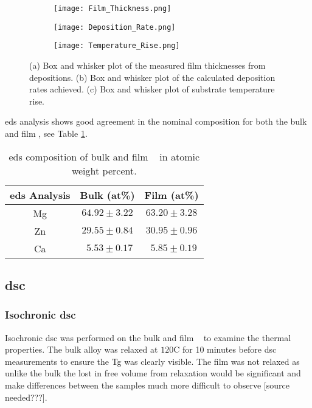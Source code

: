 \documentclass[a4paper,12pt,oneside]{article}%
\begin{document}
\begin{figure}[h]
	\centering
	\begin{subfigure}[htbp]{0.32\textwidth}
		\texttt{[image: Film\_Thickness.png]}
		\caption{}
		\label{fig:Film_Thickness}
	\end{subfigure}
	\begin{subfigure}[htbp]{0.32\textwidth}
		\texttt{[image: Deposition\_Rate.png]}
		\caption{}
		\label{fig:Deposition_Rate}
	\end{subfigure}
\begin{subfigure}[htbp]{0.32\textwidth}
	\texttt{[image: Temperature\_Rise.png]}
	\caption{}
	\label{fig:Temperature_Rise}
\end{subfigure}
	\caption{(a) Box and whisker plot of the measured film thicknesses from depositions. (b) Box and whisker plot of the calculated deposition rates achieved. (c) Box and whisker plot of substrate temperature rise.}%
	\label{fig:Film_Thickness_DepRate}
\end{figure}

\acrshort{eds} analysis shows good agreement in the nominal composition for both the bulk and film \MgZnCa, see Table \ref{tab:EDS_Composition}.

\begin{table}[h]
	\centering
	\caption{\acrshort{eds} composition of bulk and film \MgZnCa~ in atomic weight percent.}
	\begin{tabular}{ c c c }
		\toprule
		\acrshort{eds} Analysis & Bulk (at\%)  & Film (at\%)  \\
		\midrule
		Mg & $64.92 \pm 3.22$ & $63.20 \pm 3.28$ \\
		Zn & $29.55 \pm 0.84$ & $30.95 \pm 0.96$ \\
		Ca & $~~ 5.53 \pm 0.17$ & $~~ 5.85 \pm 0.19$ \\ 
		\bottomrule
	\end{tabular}
	\label{tab:EDS_Composition}
\end{table}

\subsection{\acrshort{dsc}}
\subsubsection{Isochronic \acrshort{dsc}}
Isochronic \acrshort{dsc} was performed on the bulk and film \MgZnCa~ to examine the thermal properties. The bulk alloy was relaxed at $120$\degree C for 10 minutes before \acrshort{dsc} measurements to ensure the \gls{Tg} was clearly visible. The film was not relaxed as unlike the bulk the lost in free volume from relaxation would be significant and make differences between the samples much more difficult to observe [source needed???]. 
\end{document}

